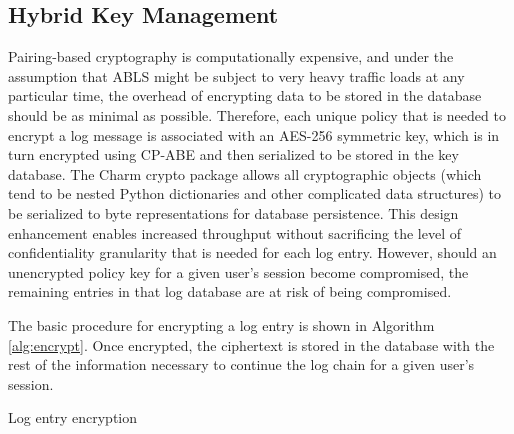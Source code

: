 \documentclass{sig-alternate}
\begin{document}
\subsection{Hybrid Key Management}
\label{sec:keyMgmt}

Pairing-based cryptography is computationally expensive, and under the assumption that ABLS might be subject 
to very heavy traffic loads at any particular time, the 
overhead of encrypting data to be stored in the database should be as minimal as possible. Therefore, each unique
policy that is needed to encrypt a log message is associated with an AES-256 symmetric key, which is in 
turn encrypted using CP-ABE and then serialized to be stored in the key database. The Charm crypto package allows all cryptographic 
objects (which tend to be nested Python dictionaries and other complicated data structures) to be serialized to byte 
representations for database persistence. This design enhancement enables 
increased throughput without sacrificing the level of confidentiality granularity that is needed for each log entry. 
However, should an unencrypted policy key for a given user's session become compromised, the remaining entries in 
that log database are at risk of being compromised. 

The basic procedure for encrypting a log entry is shown in Algorithm \ref{alg:encrypt}. Once encrypted, the ciphertext
is stored in the database with the rest of the information necessary to continue the log chain for a given user's session.
  
\begin{algorithm}[h] %
\caption{Log entry encryption} \label{alg:encrypt}
\begin{algorithmic}[1]

\ELSE
\ENDIF
{}
\end{algorithmic}
\end{algorithm}
\end{document}
